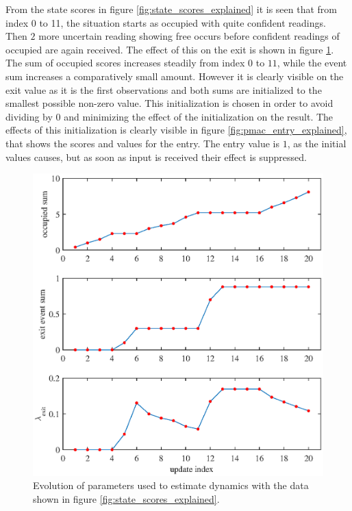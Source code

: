 From the state scores in figure \ref{fig:state_scores_explained} it is seen that from index 0 to 11, the situation starts as occupied with quite confident readings. Then $2$ more uncertain reading showing free occurs before confident readings of occupied are again received. The effect of this on the exit is shown in figure \ref{fig:pmac_exit_explained}. The sum of occupied scores increases steadily from index $0$ to $11$, while the event sum increases a comparatively small amount. However it is clearly visible on the exit  value as it is the first observations and both sums are initialized to the smallest possible non-zero value. This initialization is chosen in order to avoid dividing by $0$ and minimizing the effect of the initialization on the result. The effects of this initialization is clearly visible in figure \ref{fig:pmac_entry_explained}, that shows the scores and values for the entry. The entry value is $1$, as the initial values causes, but as soon as input is received their effect is suppressed.

\begin{figure}[htbp]
\centering
\includegraphics[scale=1]{chapters/mapping_of_dynamic_areas/figures/pmac_exit_explained}
\caption{Evolution of parameters used to estimate dynamics with the data shown in figure \ref{fig:state_scores_explained}.}
\label{fig:pmac_exit_explained}
\end{figure}

